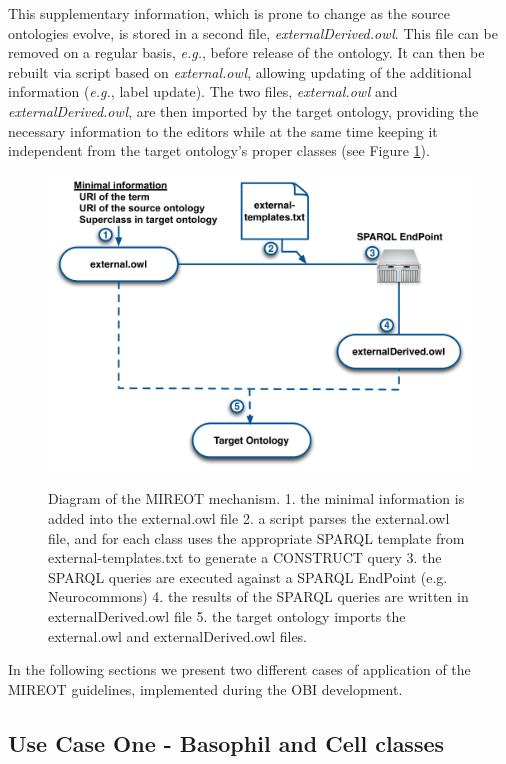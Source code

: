 \documentclass{ao2e}%
\begin{document}
This supplementary information, which is prone to change as the source ontologies evolve, is stored in a second file, \emph{externalDerived.owl}.
This file can be removed on a regular basis, \emph{e.g.}, before release of the ontology.
It can then be rebuilt via script based on \emph{external.owl}, allowing updating of the additional information (\emph{e.g.}, label update).
The two files, \emph{external.owl} and \emph{externalDerived.owl}, are then imported by the target ontology, providing the necessary information to the editors while at the same time keeping it independent from the target ontology's proper classes (see Figure \ref{fig:mechanism2}).

 
\begin{figure}[t]
\centering
{
\includegraphics[width=.9\linewidth]{./figs/mechanism2.pdf}
}
\caption{Diagram of the MIREOT mechanism.
1. the minimal information is added into the external.owl file
2. a script parses the external.owl file, and for each class uses the appropriate SPARQL template from external-templates.txt to generate a CONSTRUCT query
3. the SPARQL queries are executed against a SPARQL EndPoint (e.g. Neurocommons)
4. the results of the SPARQL queries are written in externalDerived.owl file
5. the target ontology imports the external.owl and externalDerived.owl files.
}
\label{fig:mechanism2}
\end{figure}



In the following sections we present two different cases of application of the \ac{MIREOT} guidelines, implemented during the \ac{OBI} development.


\subsection*{Use Case One - Basophil and Cell classes}
\end{document}
